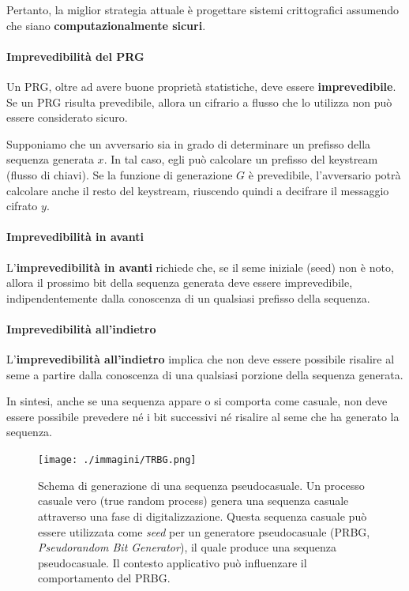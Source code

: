 \documentclass{report}
\begin{document}
Pertanto, la miglior strategia attuale è progettare sistemi crittografici assumendo che siano \textbf{computazionalmente sicuri}.

\paragraph{Imprevedibilità del PRG}
Un PRG, oltre ad avere buone proprietà statistiche, deve essere \textbf{imprevedibile}. Se un PRG risulta prevedibile, allora un cifrario a flusso che lo utilizza non può essere considerato sicuro.

Supponiamo che un avversario sia in grado di determinare un prefisso della sequenza generata \( x \). In tal caso, egli può calcolare un prefisso del keystream (flusso di chiavi). Se la funzione di generazione \( G \) è prevedibile, l’avversario potrà calcolare anche il resto del keystream, riuscendo quindi a decifrare il messaggio cifrato \( y \).

\paragraph{Imprevedibilità in avanti}
L’\textbf{imprevedibilità in avanti} richiede che, se il seme iniziale (seed) non è noto, allora il prossimo bit della sequenza generata deve essere imprevedibile, indipendentemente dalla conoscenza di un qualsiasi prefisso della sequenza.

\paragraph{Imprevedibilità all’indietro}
L’\textbf{imprevedibilità all’indietro} implica che non deve essere possibile risalire al seme a partire dalla conoscenza di una qualsiasi porzione della sequenza generata.

In sintesi, anche se una sequenza appare o si comporta come casuale, non deve essere possibile prevedere né i bit successivi né risalire al seme che ha generato la sequenza.
 
\begin{figure}[h]
    \centering
    \texttt{[image: ./immagini/TRBG.png]}
    \caption{Schema di generazione di una sequenza pseudocasuale. 
    Un processo casuale vero (true random process) genera una sequenza casuale attraverso una fase di digitalizzazione. 
    Questa sequenza casuale può essere utilizzata come \textit{seed} per un generatore pseudocasuale (PRBG, \textit{Pseudorandom Bit Generator}),
    il quale produce una sequenza pseudocasuale. Il contesto applicativo può influenzare il comportamento del PRBG.}
\end{figure}
\end{document}

